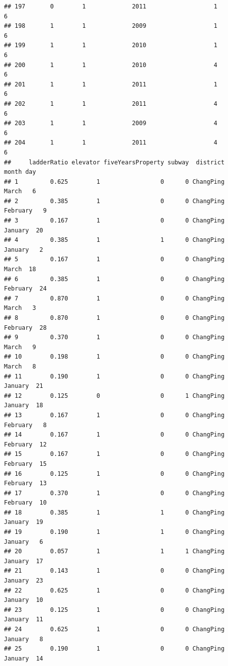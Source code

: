 \documentclass[
]{article}
\begin{document}
\begin{verbatim}
## 197       0        1             2011                   1                 6
## 198       1        1             2009                   1                 6
## 199       1        1             2010                   1                 6
## 200       1        1             2010                   4                 6
## 201       1        1             2011                   1                 6
## 202       1        1             2011                   4                 6
## 203       1        1             2009                   4                 6
## 204       1        1             2011                   4                 6
##     ladderRatio elevator fiveYearsProperty subway  district     month day
## 1         0.625        1                 0      0 ChangPing     March   6
## 2         0.385        1                 0      0 ChangPing  February   9
## 3         0.167        1                 0      0 ChangPing   January  20
## 4         0.385        1                 1      0 ChangPing   January   2
## 5         0.167        1                 0      0 ChangPing     March  18
## 6         0.385        1                 0      0 ChangPing  February  24
## 7         0.870        1                 0      0 ChangPing     March   3
## 8         0.870        1                 0      0 ChangPing  February  28
## 9         0.370        1                 0      0 ChangPing     March   9
## 10        0.198        1                 0      0 ChangPing     March   8
## 11        0.190        1                 0      0 ChangPing   January  21
## 12        0.125        0                 0      1 ChangPing   January  18
## 13        0.167        1                 0      0 ChangPing  February   8
## 14        0.167        1                 0      0 ChangPing  February  12
## 15        0.167        1                 0      0 ChangPing  February  15
## 16        0.125        1                 0      0 ChangPing  February  13
## 17        0.370        1                 0      0 ChangPing  February  10
## 18        0.385        1                 1      0 ChangPing   January  19
## 19        0.190        1                 1      0 ChangPing   January   6
## 20        0.057        1                 1      1 ChangPing   January  17
## 21        0.143        1                 0      0 ChangPing   January  23
## 22        0.625        1                 0      0 ChangPing   January  10
## 23        0.125        1                 0      0 ChangPing   January  11
## 24        0.625        1                 0      0 ChangPing   January   8
## 25        0.190        1                 0      0 ChangPing   January  14

\end{verbatim}
\end{document}
